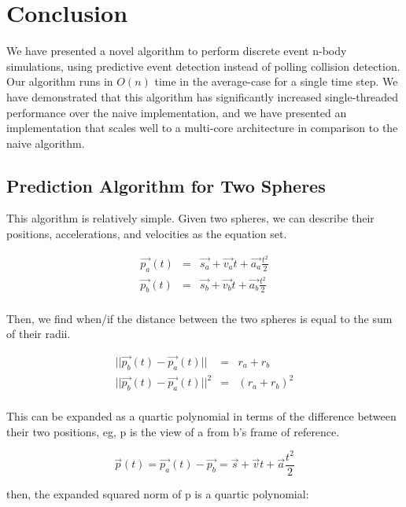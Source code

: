 \documentclass[CEJCS,PDF]{cej} %
\begin{document}
\section{Conclusion} 

We have presented a novel algorithm to perform discrete event n-body simulations, using predictive event detection instead of polling collision detection.  Our algorithm runs in $O(n)$ time in the average-case for a single time step.  We have demonstrated that this algorithm has significantly increased single-threaded performance over the naive implementation, and we have presented an implementation that scales well to a multi-core architecture in comparison to the naive algorithm.




\appendix %
\subsection{Prediction Algorithm for Two Spheres}
\label{predict}
This algorithm is relatively simple.  Given two spheres, we can describe their positions, accelerations, and velocities as the equation set.

\begin{eqnarray*}
\vec{p_a}(t)&=&\vec{s_a}+\vec{v_a} t+\vec{a_a} \frac{t ^ 2}{2} \\
\vec{p_b}(t)&=&\vec{s_b}+\vec{v_b} t+\vec{a_b} \frac{t ^ 2}{2} \\
\end{eqnarray*}

Then, we find when/if the distance between the two spheres is equal to the sum of their radii.  

\begin{eqnarray*}
|| \vec{p_b}(t)-\vec{p_a}(t) ||&=&r_a+r_b \\
|| \vec{p_b}(t)-\vec{p_a}(t) || ^ 2&=&(r_a+r_b) ^ 2 \\
\end{eqnarray*}

This can be expanded as a quartic polynomial in terms of the difference between their two positions, eg, p is the view of a from b's frame of reference.
  
\begin{equation}
\vec{p}(t)=\vec{p_a}(t)-\vec{p_b}=\vec{s}+\vec{v} t+\vec{a} \frac{t ^ 2}{2}
\end{equation}

then, the expanded squared norm of p is a quartic polynomial:
\end{document}
